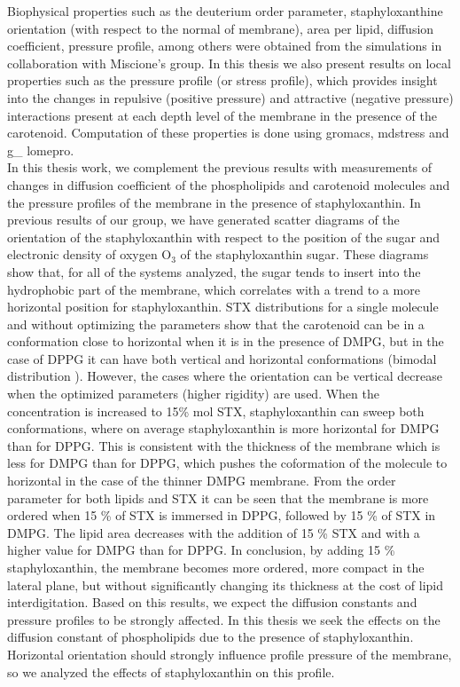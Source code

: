 \documentclass[12pt]{article}
\begin{document}
Biophysical properties such as the deuterium order parameter, staphyloxanthine orientation (with respect to the normal of membrane), area per lipid, diffusion coefficient, pressure profile, among others were obtained from the simulations in collaboration with Miscione's group. In this thesis we also present results on local properties such as the pressure profile (or stress profile), which provides insight into the changes in repulsive (positive pressure) and attractive (negative pressure) interactions present at each depth level of the membrane in the presence of the carotenoid. Computation of these properties is done using gromacs, mdstress and g\_ lomepro. \\
In this thesis work, we complement the previous results with measurements of changes in diffusion coefficient of the phospholipids and carotenoid molecules and the pressure profiles of the membrane in the presence of staphyloxanthin. In previous results of our group, we have generated scatter diagrams of the orientation of the staphyloxanthin with respect to the position of the sugar and electronic density of oxygen $ \mathrm{O} _3$ of the staphyloxanthin sugar. These diagrams show that, for all of the systems analyzed, the sugar tends to insert into the hydrophobic part of the membrane, which correlates with a trend to a more horizontal position for staphyloxanthin. STX distributions for a single molecule and without optimizing the parameters show that the carotenoid can be in a conformation close to horizontal when it is in the presence of DMPG, but in the case of DPPG it can have both vertical and horizontal conformations (bimodal distribution ). However, the cases where the orientation can be vertical decrease when the optimized parameters (higher rigidity) are used. When the concentration is increased to 15\% mol STX, staphyloxanthin can sweep both conformations, where on average staphyloxanthin is more horizontal for DMPG than for DPPG. This is consistent with the thickness of the membrane which is less for DMPG than for DPPG, which pushes the coformation of the molecule to horizontal in the case of the thinner DMPG membrane. From the order parameter for both lipids and STX it can be seen that the membrane is more ordered when 15 \% of STX is immersed in DPPG, followed by 15 \% of STX in DMPG. The lipid area decreases with the addition of 15 \% STX and with a higher value for DMPG than for DPPG. In conclusion, by adding 15 \% staphyloxanthin, the membrane becomes more ordered, more compact in the lateral plane, but without significantly changing its thickness at the cost of lipid interdigitation. Based on this results, we expect the diffusion constants and pressure profiles to be strongly affected. In this thesis we seek the effects on the diffusion constant of phospholipids due to the presence of staphyloxanthin. Horizontal orientation should strongly influence profile pressure of the membrane, so we analyzed the effects of staphyloxanthin on this profile. \\[2.0cm]
\end{document}
